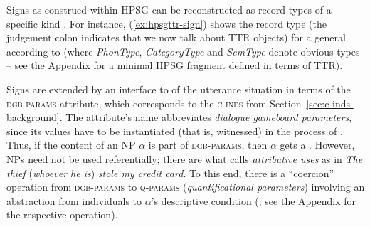 \documentclass[output=paper
 	        ,biblatex
                ,babelshorthands
                ,newtxmath
                ,draftmode
                ,colorlinks, citecolor=brown
]{langscibook}
\begin{document}
Signs as construed within HPSG can be reconstructed as record types of a specific kind \citep{Cooper:2008}.
%
For instance, (\ref{ex:hpsgttr-sign}) shows the record type (the judgement colon indicates that we now talk about TTR objects) for a general  according to \citet{Pollard:Sag:1994} (where \emph{PhonType}, \emph{CategoryType} and \emph{SemType} denote obvious types -- see the Appendix for a minimal HPSG fragment defined in terms of TTR).
%
\ea \label{ex:hpsgttr-sign}
\z

Signs are extended by an interface to  of the utterance situation in terms of the \textsc{dgb-params}  attribute, which corresponds to the \textsc{c-inds} from Section~\ref{sec:c-inds-background}.
%
The attribute's name abbreviates \emph{dialogue gameboard parameters}, since its values have to be instantiated (that is, witnessed) in the process of .
%
Thus, if the content of an NP $\alpha$ is part of \textsc{dgb-params}, then $\alpha$ gets a .
%
However, NPs need not be used referentially; there are what \citet{Donellan:1966} calls \emph{attributive uses} as in \emph{The thief} (\emph{whoever he is}) \emph{stole my credit card}.
%
To this end, there is a \enquote{coercion} operation from \textsc{dgb-params} to \textsc{q-params}  (\emph{quantificational parameters}) involving an abstraction from individuals to $\alpha$'s descriptive condition (\citealt{Purver:Ginzburg:2004}; see the Appendix for the respective operation).
\end{document}
